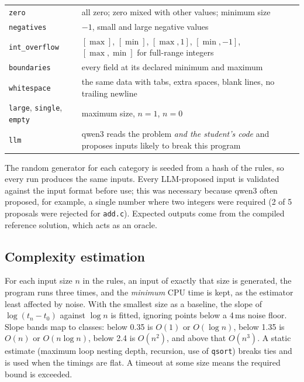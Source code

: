 \documentclass[11pt,a4paper]{article}
\newcommand{\file}[1]{\nolinkurl{#1}}
\begin{document}
\noindent\begin{tabularx}{\textwidth}{@{}P{3.2cm}L@{}}
\toprule
\texttt{zero} & all zero; zero mixed with other values; minimum size \\
\texttt{negatives} & $-1$, small and large negative values \\
\texttt{int\_overflow} & $[\max]$, $[\min]$, $[\max, 1]$, $[\min, -1]$, $[\max, \min]$ for full-range integers \\
\texttt{boundaries} & every field at its declared minimum and maximum \\
\texttt{whitespace} & the same data with tabs, extra spaces, blank lines, no trailing newline \\
\texttt{large}, \texttt{single}, \texttt{empty} & maximum size, $n=1$, $n=0$ \\
\texttt{llm} & qwen3 reads the problem \emph{and the student's code} and proposes inputs likely to break this program \\
\bottomrule
\end{tabularx}

\medskip
The random generator for each category is seeded from a hash of the rules, so every run produces the same inputs.
Every LLM-proposed input is validated against the input format before use; this was necessary because qwen3 often
proposed, for example, a single number where two integers were required (2 of 5 proposals were rejected for
\file{add.c}). Expected outputs come from the compiled reference solution, which acts as an oracle.

\subsection{Complexity estimation}\label{sec:complexity}
For each input size $n$ in the rules, an input of exactly that size is generated, the program runs three times, and the
\emph{minimum} CPU time is kept, as the estimator least affected by noise. With the smallest size as a baseline, the
slope of $\log(t_n - t_0)$ against $\log n$ is fitted, ignoring points below a 4\,ms noise floor. Slope bands map to
classes: below 0.35 is $O(1)$ or $O(\log n)$, below 1.35 is $O(n)$ or $O(n\log n)$, below 2.4 is $O(n^2)$, and above
that $O(n^3)$. A static estimate (maximum loop nesting depth, recursion, use of \texttt{qsort}) breaks ties and is used
when the timings are flat. A timeout at some size means the required bound is exceeded.
\end{document}
